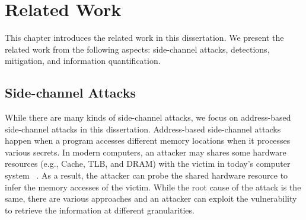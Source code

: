 
\chapter{Related Work}\label{chapter2}
This chapter introduces the related work in this dissertation. We present the related work from the following aspects: side-channel attacks, detections, mitigation, and information quantification.

\section{Side-channel Attacks}
While there are many kinds of side-channel attacks, we focus on address-based side-channel attacks in this dissertation.
Address-based side-channel attacks happen when a program accesses different memory locations when it processes various secrets. In modern computers, an attacker may shares some hardware resources (e.g., Cache, TLB, and DRAM) with the victim in today's computer system ~\cite{ge2018survey,szefer2019survey}. As a result, the attacker can probe the shared hardware resource to infer the memory accesses of the victim. While the root cause of the attack is the same, there are various approaches and an attacker can exploit the vulnerability to retrieve the information at different granularities.

